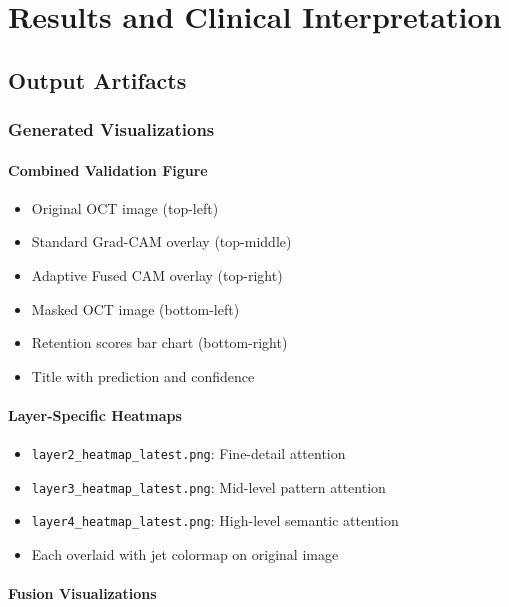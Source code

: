 \documentclass[12pt,a4paper,oneside]{book}
\begin{document}
\chapter{Results and Clinical Interpretation}
\label{ch:results}

\section{Output Artifacts}

\subsection{Generated Visualizations}

\subsubsection{Combined Validation Figure}

\begin{itemize}
  \item Original OCT image (top-left)
  \item Standard Grad-CAM overlay (top-middle)
  \item Adaptive Fused CAM overlay (top-right)
  \item Masked OCT image (bottom-left)
  \item Retention scores bar chart (bottom-right)
  \item Title with prediction and confidence
\end{itemize}

\subsubsection{Layer-Specific Heatmaps}

\begin{itemize}
  \item \texttt{layer2\_heatmap\_latest.png}: Fine-detail attention
  \item \texttt{layer3\_heatmap\_latest.png}: Mid-level pattern attention
  \item \texttt{layer4\_heatmap\_latest.png}: High-level semantic attention
  \item Each overlaid with jet colormap on original image
\end{itemize}

\subsubsection{Fusion Visualizations}
\end{document}
